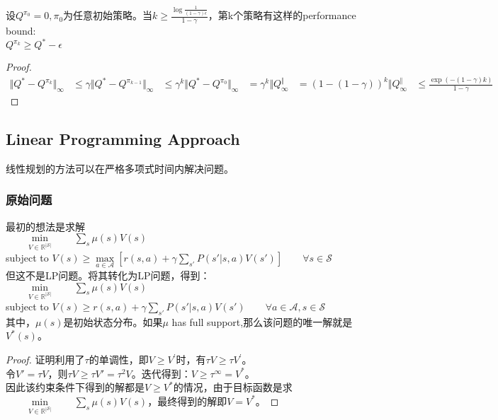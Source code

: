 \begin{theorem}
    设$Q^{\pi_0}=0,\pi_0$为任意初始策略。当$k\geq \frac{\log\frac{1}{(1-\gamma )\epsilon}}{1-\gamma} $，第k个策略有这样的performance bound:\\
    $Q^{\pi_k}\geq Q^*-\epsilon $
\end{theorem}

\begin{proof}
    \begin{equation}
        \begin{aligned}
            \Vert Q^*-Q^{\pi_k}\Vert_\infty&\leq\gamma\Vert Q^*-Q^{\pi_{k-1}}\Vert_\infty
            &\leq \gamma^k\Vert Q^*-Q^{\pi_0}\Vert_\infty
            &=\gamma^k\Vert Q^\Vert_\infty
            &=(1-(1-\gamma))^k\Vert Q^\Vert_\infty
            &\leq \frac{\exp (-(1-\gamma)k)}{1-\gamma} 
        \end{aligned}
    \end{equation}
\end{proof}


\subsection{Linear Programming Approach}
线性规划的方法可以在严格多项式时间内解决问题。\\
\subsubsection{原始问题}
最初的想法是求解\\
$\qquad\underset{V\in \mathbb{R}^{|\mathcal{S}|}}{\min}\qquad{\sum_s\mu (s)V(s)}$\\
subject to  $V(s)\geq\underset{a\in \mathcal{A}}{\max}[r(s,a)+\gamma\underset{s'}{\sum}{P(s'|s,a)V(s')}] \qquad \forall s\in\mathcal{S}$\\
但这不是LP问题。将其转化为LP问题，得到：\\
$\qquad\underset{V\in \mathbb{R}^{|\mathcal{S}|}}{\min}\qquad{\sum_s\mu (s)V(s)}$\\
subject to  $V(s)\geq r(s,a)+\gamma\underset{s'}{\sum}{P(s'|s,a)V(s')} \qquad \forall a\in\mathcal{A},s\in\mathcal{S} $\\
其中，$\mu (s)$是初始状态分布。如果$\mu$ has full support,那么该问题的唯一解就是$V^*(s)$。
\begin{proof}
    证明利用了$\tau$的单调性，即$V \geq V^{'}$时，有$\tau V \geq \tau V^{'}$。\\
    令$V'=\tau V$，则$\tau V\geq\tau V'=\tau^2V$。迭代得到：$V\geq\tau^\infty=V^*$。\\
    因此该约束条件下得到的解都是$V\geq V^*$的情况，由于目标函数是求$\qquad\underset{V\in \mathbb{R}^{|\mathcal{S}|}}{\min}\qquad{\sum_s\mu (s)V(s)}$，最终得到的解即$V=V^*$。
\end{proof}
